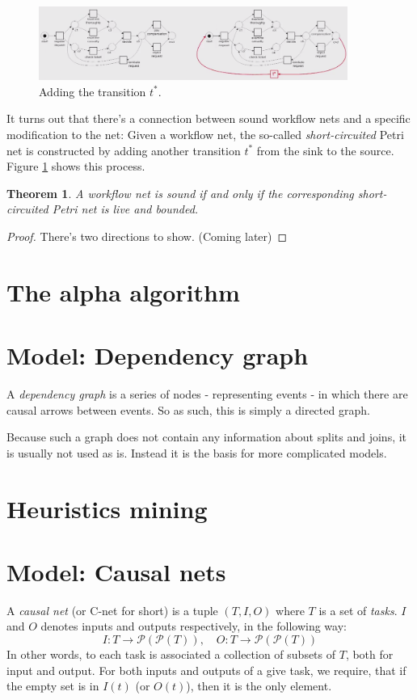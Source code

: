 \documentclass[12pt, a4paper]{article}
\newtheorem{theorem}{Theorem}[section]
\numberwithin{equation}{section}
\begin{document}
\begin{figure}
\centering
\includegraphics[width=0.9\textwidth]{wf_theorem}
\caption{Adding the transition $t^*$.}
\label{fig:wf_theorem}
\end{figure}

It turns out that there's a connection between sound workflow nets and a specific modification to the net: Given a workflow net, the so-called \textit{short-circuited} Petri net is constructed by adding another transition $t^*$ from the sink to the source. Figure \ref{fig:wf_theorem} shows this process.

\begin{theorem}
A workflow net is sound if and only if the corresponding short-circuited Petri net is live and bounded.
\end{theorem}
\begin{proof}
There's two directions to show. (Coming later)
\end{proof}

\section{The alpha algorithm}

\section{Model: Dependency graph}
A \textit{dependency graph} is a series of nodes - representing events - in which there are causal arrows between events. So as such, this is simply a directed graph.

Because such a graph does not contain any information about splits and joins, it is usually not used as is. Instead it is the basis for more complicated models.

\section{Heuristics mining}


\section{Model: Causal nets}
A \textit{causal net} (or C-net for short) is a tuple $(T,I,O)$ where $T$ is a set of \textit{tasks}. $I$ and $O$ denotes inputs and outputs respectively, in the following way:
\begin{equation}
I: T\rightarrow\mathcal{P}(\mathcal{P}(T)),\quad
O: T\rightarrow\mathcal{P}(\mathcal{P}(T))
\end{equation}
In other words, to each task is associated a collection of subsets of $T$, both for input and output. For both inputs and outputs of a give task, we require, that if the empty set is in $I(t)$ (or $O(t)$), then it is the only element.
\end{document}
